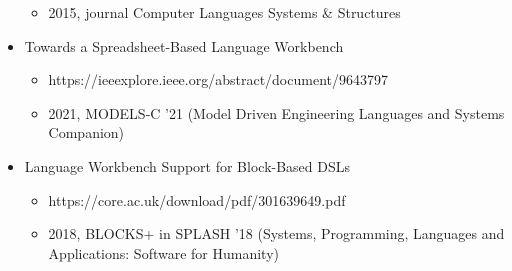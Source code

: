 \begin{itemize}
\begin{itemize}
        \item 2015, journal Computer Languages Systems \& Structures
      \end{itemize}
      \item Towards a Spreadsheet-Based Language Workbench
      \begin{itemize}
        \item https://ieeexplore.ieee.org/abstract/document/9643797
        \item 2021, MODELS-C '21 (Model Driven Engineering Languages and Systems Companion)
      \end{itemize}
      \item Language Workbench Support for Block-Based DSLs
      \begin{itemize}
        \item https://core.ac.uk/download/pdf/301639649.pdf
        \item 2018, BLOCKS+ in SPLASH '18 (Systems, Programming, Languages and Applications: Software for Humanity)
      \end{itemize}
    \end{itemize}